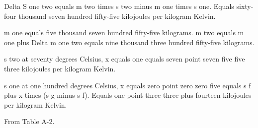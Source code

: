 Delta S one two equals m two times s two minus m one times s one.  
Equals sixty-four thousand seven hundred fifty-five kilojoules per kilogram Kelvin.  

m one equals five thousand seven hundred fifty-five kilograms.  
m two equals m one plus Delta m one two equals nine thousand three hundred fifty-five kilograms.  

s two at seventy degrees Celsius, x equals one equals seven point seven five five three kilojoules per kilogram Kelvin.  

s one at one hundred degrees Celsius, x equals zero point zero zero five equals s f plus x times (s g minus s f).  
Equals one point three three plus fourteen kilojoules per kilogram Kelvin.  

From Table A-2.